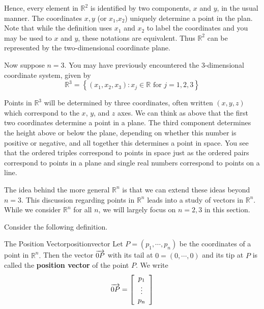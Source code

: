Hence, every element in $\mathbb{R}^2$ is identified by two
components, $x$ and $y$, in the usual manner. The coordinates $x, y$ (or $x_1$,$x_2$) uniquely determine a point in the plan. Note that while the definition uses $x_1$ and $x_2$ to label the coordinates and you may be used to $x$ and $y$, these notations are equivalent. Thus $\mathbb{R}^2$ can be represented by the two-dimensional coordinate plane.

Now suppose $n=3$. You may have previously encountered the $3$-dimensional
coordinate system, given by
\begin{equation*}
\mathbb{R}^{3}=
\left\{ \left( x_{1}, x_{2}, x_{3}\right)
:x_{j}\in \mathbb{R}\text{ for }j=1,2,3 \right\}
\end{equation*}

Points in $\mathbb{R}^3$ will be determined by three
coordinates, often written $\left(x,y,z\right)$ which correspond to the $x$, $y$,
and $z$ axes.  We can think as above that the first two coordinates
determine a point in a plane. The third component determines the
height above or below the plane, depending on whether this number is
positive or negative, and all together this determines a point in
space. You
see that the ordered triples correspond to points in space just as the
ordered pairs correspond to points in a plane and single real numbers
correspond to points on a line.

The idea behind the more general $\mathbb{R}^n$ is that we can extend
these ideas beyond $n = 3.$ This discussion regarding points in $\mathbb{R}^n$ leads into a study of vectors in $\mathbb{R}^n$. While we consider $\mathbb{R}^n$ for all $n$,
we will largely  focus on $n=2,3$ in this section. 

Consider the following definition.

\begin{definition}{The Position Vector}{positionvector}
Let $P=\left( p_{1},\cdots ,p_{n}\right) $ be the coordinates of a
point in $\mathbb{R}^{n}.$ Then the vector $\overrightarrow{0P}$ with its tail at
$0=\left( 0,\cdots ,0\right) $ and its tip at 
$P$ is called the \textbf{position vector} of the point $P$. 
We write 
\begin{equation*}
\overrightarrow{0P} = \left[ 
\begin{array}{c}
p_{1} \\
\vdots \\
p_{n}
\end{array} \right]
\end{equation*}
\end{definition}

